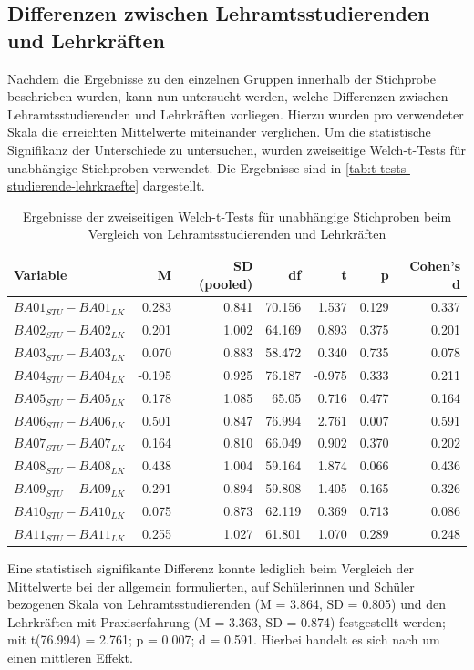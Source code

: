 \subsection{Differenzen zwischen Lehramtsstudierenden und Lehrkräften}
\label{subsec:differenzen-studierende-lehrkraefte}

Nachdem die Ergebnisse zu den einzelnen Gruppen innerhalb der Stichprobe beschrieben wurden, kann nun untersucht werden, welche Differenzen zwischen Lehramtsstudierenden und Lehrkräften vorliegen.
Hierzu wurden pro verwendeter Skala die erreichten Mittelwerte miteinander verglichen.
Um die statistische Signifikanz der Unterschiede zu untersuchen, wurden zweiseitige Welch-t-Tests für unabhängige Stichproben verwendet.
Die Ergebnisse sind in \autoref{tab:t-tests-studierende-lehrkraefte} dargestellt.

\begin{table}[h!]
	\begin{tabularx}{\textwidth}{X | r | r | r | r | r | r}
		\hline
		Variable & M & SD (pooled) & df & t & p & Cohen's d\\
		\hline
		$BA01_{STU} - BA01_{LK}$ & 0.283 & 0.841 & 70.156 & 1.537 & 0.129 & 0.337\\
		$BA02_{STU} - BA02_{LK}$ & 0.201 & 1.002 & 64.169 & 0.893 & 0.375 & 0.201\\
		$BA03_{STU} - BA03_{LK}$ & 0.070 & 0.883 & 58.472 & 0.340 & 0.735 & 0.078\\
		$BA04_{STU} - BA04_{LK}$ & -0.195 & 0.925 & 76.187 & -0.975 & 0.333 & 0.211\\
		$BA05_{STU} - BA05_{LK}$ & 0.178 & 1.085 & 65.05 & 0.716 & 0.477 & 0.164\\
		$BA06_{STU} - BA06_{LK}$ & 0.501 & 0.847 & 76.994 & 2.761 & 0.007 & 0.591\\
		$BA07_{STU} - BA07_{LK}$ & 0.164 & 0.810 & 66.049 & 0.902 & 0.370 & 0.202\\
		$BA08_{STU} - BA08_{LK}$ & 0.438 & 1.004 & 59.164 & 1.874 & 0.066 & 0.436\\
		$BA09_{STU} - BA09_{LK}$ & 0.291 & 0.894 & 59.808 & 1.405 & 0.165 & 0.326\\
		$BA10_{STU} - BA10_{LK}$ & 0.075 & 0.873 & 62.119 & 0.369 & 0.713 & 0.086\\
		$BA11_{STU} - BA11_{LK}$ & 0.255 & 1.027 & 61.801 & 1.070 & 0.289 & 0.248\\
		\hline
	\end{tabularx}
	\caption{Ergebnisse der zweiseitigen Welch-t-Tests für unabhängige Stichproben beim Vergleich von Lehramtsstudierenden und Lehrkräften}
	\label{tab:t-tests-studierende-lehrkraefte}
\end{table}

Eine statistisch signifikante Differenz konnte lediglich beim Vergleich der Mittelwerte bei der allgemein formulierten, auf Schülerinnen und Schüler bezogenen Skala von Lehramtsstudierenden (M = 3.864, SD = 0.805) und den Lehrkräften mit Praxiserfahrung (M = 3.363, SD = 0.874) festgestellt werden; mit t(76.994) = 2.761; p = 0.007; d = 0.591.
Hierbei handelt es sich nach \citet{cohen1992power} um einen mittleren Effekt.